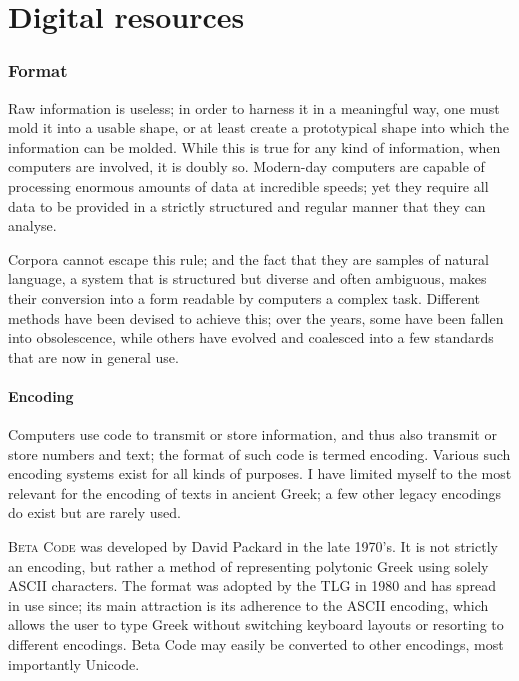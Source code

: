 \chapter{Digital resources}
\label{chp:digitalresources}
\raggedbottom 
\minitoc\mtcskip

\subsection{Format}
\label{subsect:format}
Raw information is useless; in order to harness it in a meaningful way, one
must mold it into a usable shape, or at least create a prototypical shape into
which the information can be molded. While this is true for any kind of
information, when computers are involved, it is doubly so. Modern-day computers
are capable of processing enormous amounts of data at incredible speeds; yet
they require all data to be provided in a strictly structured and regular
manner that they can analyse.

 Corpora cannot escape this rule; and the fact
that they are samples of natural language, a system that is structured but
diverse and often ambiguous, makes their conversion into a form readable by
computers a complex task. Different methods have been devised to achieve this;
over the years, some have been fallen into obsolescence, while others have
evolved and coalesced into a few standards that are now in general use.
\subsubsection{Encoding}
\label{subsubsect:encoding}
Computers use code to transmit or store information, and thus also transmit or
store numbers and text; the format of such code is termed encoding. Various
such encoding systems exist for all kinds of purposes. I have limited myself to
the most relevant for the encoding of texts in ancient Greek; a few other
legacy encodings do exist but are rarely used.

 \textsc{Beta Code} was
developed by David Packard in the late 1970's. It is not strictly an encoding,
but rather a method of representing polytonic Greek using solely ASCII
characters. The format was adopted by the TLG in 1980 and has spread in use
since; its main attraction is its adherence to the ASCII encoding, which allows
the user to type Greek without switching keyboard layouts or resorting to
different encodings. Beta Code may easily be converted to other encodings, most
importantly Unicode.

